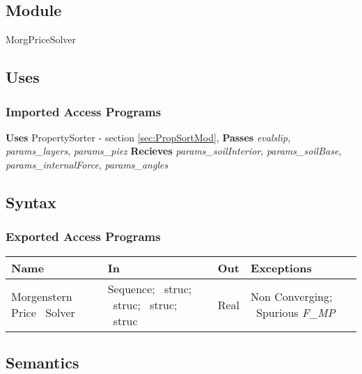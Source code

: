 \documentclass[12pt, titlepage]{article}
\begin{document}
\subsection{Module}
MorgPriceSolver

\subsection{Uses}

\subsubsection{Imported Access Programs}

\noindent
\textbf{Uses} PropertySorter - section \ref{sec:PropSortMod},
\textbf{Passes} \textit{evalslip}, \textit{params\_layers},
\textit{params\_piez} \textbf{Recieves} \textit{params\_soilInterior},
\textit{params\_soilBase}, \textit{params\_internalForce},
\textit{params\_angles}

\subsection{Syntax}

\subsubsection{Exported Access Programs}
\begin{center}
\renewcommand*{\arraystretch}{1.5}
\begin{tabular}{| p{} | p{} | 
p{} | p{} |} \hline 

  \textbf{Name} & \textbf{In} & \textbf{Out} & \textbf{Exceptions}
  \\ \hline

  Morgenstern Price ~\newline Solver & Sequence; ~\newline struc;
  ~\newline struc; ~\newline struc; ~\newline struc & Real & Non
  Converging; ~\newline Spurious \textit{F\_MP} \\ \hline
\end{tabular}
\end{center}

\subsection{Semantics}
\end{document}
